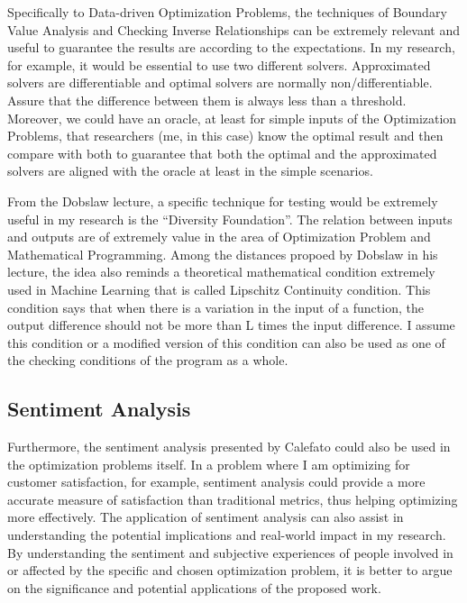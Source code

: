 \documentclass{article}
\begin{document}
Specifically to Data-driven Optimization Problems, the techniques of Boundary Value Analysis and Checking Inverse Relationships can be extremely relevant and useful to guarantee the results are according to the expectations. In my research, for example, it would be essential to use two different solvers. Approximated solvers are differentiable and optimal solvers are normally non/differentiable. Assure that the difference between them is always less than a threshold. Moreover, we could have an oracle, at least for simple inputs of the Optimization Problems, that researchers (me, in this case) know the optimal result and then compare with both to guarantee that both the optimal and the approximated solvers are aligned with the oracle at least in the simple scenarios.

From the Dobslaw lecture, a specific technique for testing would be extremely useful in my research is the “Diversity Foundation”. The relation between inputs and outputs are of extremely value in the area of Optimization Problem and Mathematical Programming. Among the distances propoed by Dobslaw in his lecture, the idea also reminds a theoretical mathematical condition extremely used in Machine Learning that is called Lipschitz Continuity condition. This condition says that when there is a variation in the input of a function, the output difference should not be more than L times the input difference. I assume this condition or a modified version of this condition can also be used as one of the checking conditions of the program as a whole.


\subsection{Sentiment Analysis}

Furthermore, the sentiment analysis presented by Calefato could also be used in the optimization problems itself. In a problem where I am optimizing for customer satisfaction, for example, sentiment analysis could provide a more accurate measure of satisfaction than traditional metrics, thus helping optimizing more effectively. The application of sentiment analysis can also assist in understanding the potential implications and real-world impact in my research. By understanding the sentiment and subjective experiences of people involved in or affected by the specific and chosen optimization problem, it is better to argue on the significance and potential applications of the proposed work.
\end{document}
